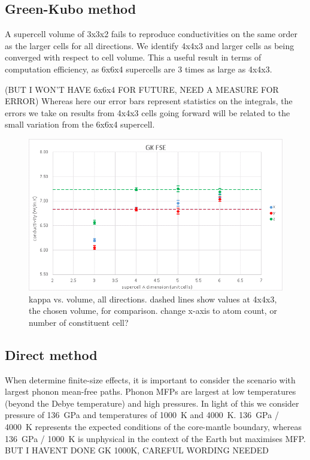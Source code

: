 \documentclass[%
preprint,                                  %
nofootinbib,
 amsmath,amssymb,
 aps,
]{revtex4-1}
\begin{document}
\subsection{\label{sec:results.gk}Green-Kubo method}

A supercell volume of 3x3x2 fails to reproduce conductivities on the same order as the larger cells for all directions. We identify 4x4x3 and larger cells as being converged with respect to cell volume. This a useful result in terms of computation efficiency, as 6x6x4 supercells are 3 times as large as 4x4x3. 

(BUT I WON'T HAVE 6x6x4 FOR FUTURE, NEED A MEASURE FOR ERROR) Whereas here our error bars represent statistics on the integrals, the errors we take on results from 4x4x3 cells going forward will be related to the small variation from the 6x6x4 supercell.

\begin{figure}[h!]
  \includegraphics[width=\linewidth]{images/gk_fse_draft.png}
  \caption{kappa vs. volume, all directions. dashed lines show values at 4x4x3, the chosen volume, for comparison. change x-axis to atom count, or number of constituent cell?}
  \label{fig:gk_fse}
\end{figure}








\subsection{\label{sec:results.direct}Direct method}

When determine finite-size effects, it is important to consider the scenario with largest phonon mean-free paths. Phonon MFPs are largest at low temperatures (beyond the Debye temperature) and high pressures. In light of this we consider pressure of 136~GPa and temperatures of 1000~K and 4000~K. 136~GPa / 4000~K represents the expected conditions of the core-mantle boundary, whereas 136~GPa / 1000~K is unphysical in the context of the Earth but maximises MFP.  BUT I HAVENT DONE GK 1000K, CAREFUL WORDING NEEDED
\end{document}
